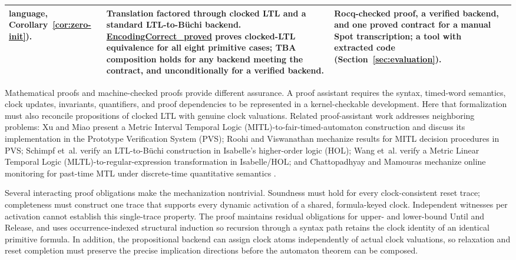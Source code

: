 \documentclass[manuscript]{acmart}
\newcommand{\Rocqid}[1]{\url{#1}}
\begin{document}
\begin{table}[!t]
\begin{tabular}{@{}p{}p{}p{}p{}@{}}
language, Corollary~\ref{cor:zero-init}). & Translation factored through clocked LTL and a standard LTL-to-B\"uchi backend. \Rocqid{EncodingCorrect_proved} proves clocked-LTL equivalence for all eight primitive cases; TBA composition holds for any backend meeting the contract, and unconditionally for a verified backend. & Rocq-checked proof, a verified backend, and one proved contract for a manual Spot transcription; a tool with extracted code (Section~\ref{sec:evaluation}).\\
\bottomrule
\end{tabular}
\end{table}

Mathematical proofs and machine-checked proofs provide different assurance.
A proof assistant requires the syntax, timed-word semantics, clock updates,
invariants, quantifiers, and proof dependencies to be represented in a
kernel-checkable development. Here that formalization must also reconcile
propositions of clocked LTL with genuine clock
valuations. Related proof-assistant
work addresses neighboring problems: Xu and Miao present a Metric Interval
Temporal Logic (MITL)-to-fair-timed-automaton construction and discuss its
implementation in the Prototype Verification System (PVS); Roohi and
Viswanathan mechanize results for MITL decision procedures in PVS; Schimpf et~al. verify an LTL-to-B\"uchi construction in Isabelle's higher-order logic
(HOL); Wang et~al. verify a
Metric Linear Temporal Logic (MLTL)-to-regular-expression transformation in
Isabelle/HOL; and Chattopadhyay and Mamouras mechanize online monitoring for
past-time MTL under discrete-time quantitative semantics
\cite{xu08,roohi_viswanathan_vmcai18,schimpf_tphols09,
wang_mltl_tacas25,chattopadhyay_mamouras_rv20}.

Several interacting proof obligations make the mechanization nontrivial.
Soundness must hold for every clock-consistent reset trace;
completeness must construct one trace that supports every dynamic activation
of a shared, formula-keyed clock. Independent witnesses per activation cannot
establish this single-trace property. The proof maintains residual obligations
for upper- and lower-bound Until and Release, and uses occurrence-indexed
structural induction so recursion through a syntax path retains the clock
identity of an identical primitive formula. In addition, the propositional backend can
assign clock atoms independently of actual clock valuations, so relaxation
and reset completion must preserve the precise implication directions before
the automaton theorem can be composed.
\end{document}
